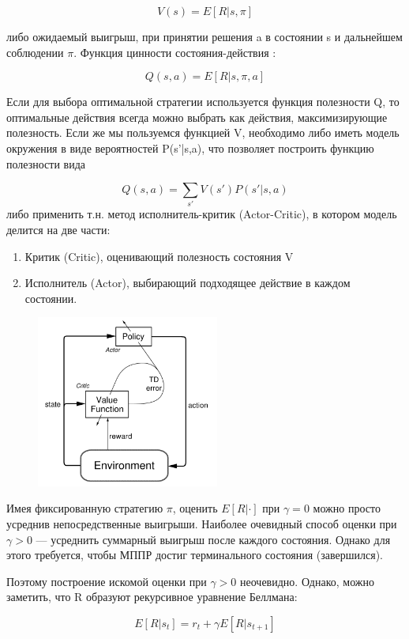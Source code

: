 \documentclass[a4paper,12pt]{article}
\begin{document}
        $$V(s)=E[R|s,\pi]$$

либо ожидаемый выигрыш, при принятии решения a в состоянии s и дальнейшем соблюдении $\pi$. Функция цинности состояния-действия :

        $$Q(s,a)=E[R|s,\pi,a]$$

Если для выбора оптимальной стратегии используется функция полезности Q, то оптимальные действия всегда можно выбрать как действия, максимизирующие полезность. Если же мы пользуемся функцией V, необходимо либо иметь модель окружения в виде вероятностей P(s'|s,a), что позволяет построить функцию полезности вида

        $$Q(s,a)=\sum_{s'}V(s')P(s'|s,a)$$
\newpage
либо применить т.н. метод исполнитель-критик (Actor-Critic), в котором модель делится на две части:
\begin{enumerate}
    \item Критик (Critic), оценивающий полезность состояния V
    \item Исполнитель (Actor), выбирающий подходящее действие в каждом состоянии.
\end{enumerate}

\begin{figure}[h]
    \centering
    \includegraphics[width=6cm]{img/actor.png}
    \label{fig:actor-critic}
\end{figure}

Имея фиксированную стратегию $\pi$, оценить $E[R|\cdot]$ при $\gamma=0$ можно просто усреднив непосредственные выигрыши. Наиболее очевидный способ оценки при $\gamma>0$ — усреднить суммарный выигрыш после каждого состояния. Однако для этого требуется, чтобы МППР достиг терминального состояния (завершился).

Поэтому построение искомой оценки при $\gamma>0$ неочевидно. Однако, можно заметить, что R образуют рекурсивное уравнение Беллмана:

        $$E[R|s_t]=r_t+\gamma E[R|s_{t+1}]$$
\end{document}
